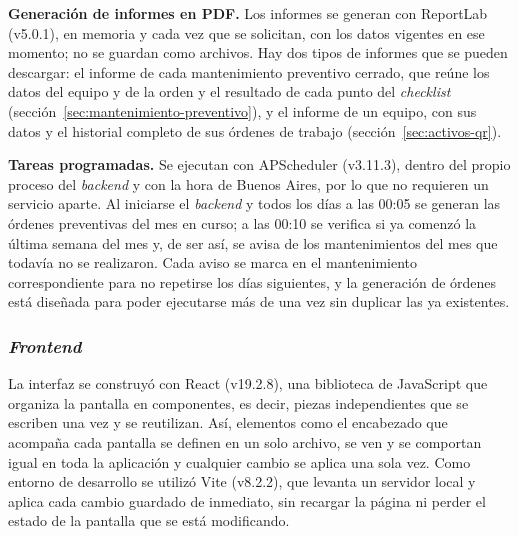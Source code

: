 \documentclass[10pt]{article}
\begin{document}
\textbf{Generación de informes en PDF.} Los informes se generan con ReportLab (v5.0.1), en memoria y cada vez que se solicitan, con los datos vigentes en ese momento; no se guardan como archivos. Hay dos tipos de informes que se pueden descargar: el informe de cada mantenimiento preventivo cerrado, que reúne los datos del equipo y de la orden y el resultado de cada punto del \textit{checklist} (sección~\ref{sec:mantenimiento-preventivo}), y el informe de un equipo, con sus datos y el historial completo de sus órdenes de trabajo (sección~\ref{sec:activos-qr}).

\textbf{Tareas programadas.} Se ejecutan con APScheduler (v3.11.3), dentro del propio proceso del \textit{backend} y con la hora de Buenos Aires, por lo que no requieren un servicio aparte. Al iniciarse el \textit{backend} y todos los días a las 00:05 se generan las órdenes preventivas del mes en curso; a las 00:10 se verifica si ya comenzó la última semana del mes y, de ser así, se avisa de los mantenimientos del mes que todavía no se realizaron. Cada aviso se marca en el mantenimiento correspondiente para no repetirse los días siguientes, y la generación de órdenes está diseñada para poder ejecutarse más de una vez sin duplicar las ya existentes. 


\subsubsection{\textit{Frontend}}

La interfaz se construyó con React (v19.2.8), una biblioteca de JavaScript que organiza la pantalla en componentes, es decir, piezas independientes que se escriben una vez y se reutilizan. Así, elementos como el encabezado que acompaña cada pantalla se definen en un solo archivo, se ven y se comportan igual en toda la aplicación y cualquier cambio se aplica una sola vez. Como entorno de desarrollo se utilizó Vite (v8.2.2), que levanta un servidor local y aplica cada cambio guardado de inmediato, sin recargar la página ni perder el estado de la pantalla que se está modificando. 
\end{document}

